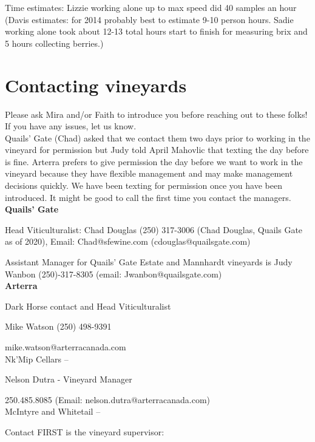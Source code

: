 \documentclass[11pt,letter]{article}
\begin{document}
Time estimates: Lizzie working alone up to max speed did 40 samples an hour (Davis estimates: for 2014 probably best to estimate 9-10 person hours. Sadie working alone took about 12-13 total hours start to finish for measuring brix and 5 hours collecting berries.)

\section{Contacting vineyards}
Please ask Mira and/or Faith to introduce you before reaching out to these folks! If you have any issues, let us know.\\

Quails' Gate (Chad) asked that we contact them two days prior to working in the vineyard for permission but Judy told April Mahovlic that texting the day before is fine. Arterra prefers to give permission the day before we want to work in the vineyard because they have flexible management and may make management decisions quickly. We have been texting for permission once you have been introduced. It might be good to call the first time you contact the managers. \\


{\bf Quails' Gate}

Head Viticulturalist: Chad Douglas (250) 317-3006 (Chad Douglas, Quails Gate as of 2020), Email: Chad@sfewine.com (cdouglas@quailsgate.com)

Assistant Manager for Quails' Gate Estate and Mannhardt vineyards is Judy Wanbon (250)-317-8305 (email: Jwanbon@quailsgate.com) \\

{\bf Arterra}

Dark Horse contact and Head Viticulturalist %

Mike Watson (250) 498-9391

mike.watson@arterracanada.com\\

Nk'Mip Cellars --

Nelson Dutra - Vineyard Manager

250.485.8085 (Email: nelson.dutra@arterracanada.com) \\

McIntyre and Whitetail -- 

Contact FIRST is the vineyard supervisor:
\end{document}
